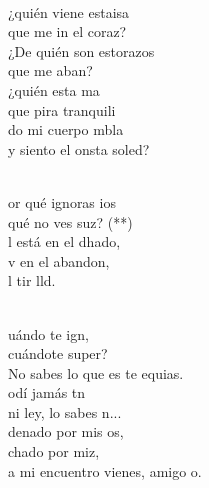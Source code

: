 \documentclass[12pt]{article}
\begin{document}
\begin{multicols*}{2}
\begin{cancion}[Saulo][Nico]%
	    \\
	¿quién viene estaisa \\
	que me in el coraz?\\
	¿De quién son estorazos \\
	que me aban?\\
	¿quién esta ma\\
	que pira tranquili\\
	do mi cuerpo mbla\\
	y siento el onsta soled?\\\jump\\
	\begin{chorus}%
	or qué ignoras ios\\
	qué no ves suz? (**)\\
	l está en el dhado,\\
	v en el abandon,\\
	l tir lld.\\
	\end{chorus}%
	\jump\\
	uándo te ign, \\
	cuándote super?\\
	No sabes lo que es te equias.\\
	odí jamás tn\\
	ni ley, lo sabes n...\\
	denado por mis os, \\
	chado por miz,\\
	a mi encuentro vienes,  amigo o.\\

\end{cancion}
\end{multicols*}
\end{document}
